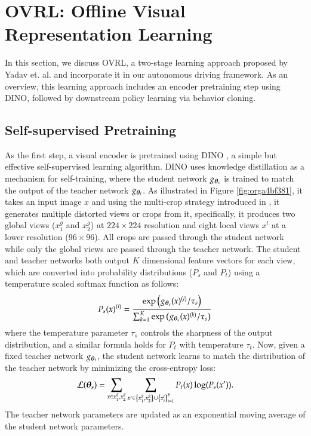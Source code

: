 \documentclass[12pt, letterpaper,cleardoubleempty,BCOR1cm]{scrbook}
\begin{document}
\section{OVRL: Offline Visual Representation Learning}
\label{sec:orgf5ff591}
In this section, we discuss OVRL\cite{Yadav2022}, a two-stage learning approach
proposed by Yadav et. al. and incorporate it in our autonomous driving
framework. As an overview, this learning approach includes an encoder
pretraining step using DINO, followed by downstream policy learning via behavior
cloning.
\subsection{Self-supervised Pretraining}
\label{sec:org5dac6c1}
As the first step, a visual encoder is pretrained using DINO \cite{Caron2021}, a
simple but effective self-supervised learning algorithm. DINO uses knowledge
distillation as a mechanism for self-training, where the student network
\(g_{\boldsymbol{\theta}_{s}}\) is trained to match the output of the teacher network
\(g_{\boldsymbol{\theta}_{t}}\).  As illustrated in Figure \ref{fig:orga4bf381}, it takes an input image
\(x\) and using the multi-crop strategy introduced in \cite{Caron2020}, it
generates multiple distorted views or crops from it, specifically, it produces
two global views (\(x_{1}^{g}\) and \(x_{2}^{g}\)) at \(224\times 224\) resolution
and eight local views \(x^{l}\) at a lower resolution (\(96\times 96\)). All crops
are passed through the student network while only the global views are passed
through the teacher network.  The student and teacher networks both output \(K\)
dimensional feature vectors for each view, which are converted into probability
distributions (\(P_{s}\) and \(P_{t}\)) using a temperature scaled softmax
function as follows:
\[P_{s}(x)^{(i)}=\frac{\exp\left( g_{\boldsymbol{\theta}_{s}}(x)^{(i)}/\tau_{s} \right)}{\sum_{k=1}^{K}\exp\left( g_{\boldsymbol{\theta}_{s}}(x)^{(k)}/\tau_{s} \right)}\]
where the temperature parameter \(\tau_{s}\) controls the sharpness of the output
distribution, and a similar formula holds for \(P_{t}\) with temperature
\(\tau_{t}\). Now, given a fixed teacher network \(g_{\boldsymbol{\theta}_{t}}\), the student
network learns to match the distribution of the teacher network by minimizing
the cross-entropy loss:
\[\mathcal{L}(\boldsymbol{\theta}_{s})=\sum_{x\in{x_{1}^{g},x_{2}^{g}}}\sum_{x'\in
\left\lbrace x_{1}^{g},x_{2}^{g} \right\rbrace\cup\left\lbrace x^{l}_{i} \right\rbrace_{i=1}^{8}}P_{t}(x)\log(P_{s}(x')).\] The
teacher network parameters are updated as an exponential moving average of the
student network parameters.
\end{document}
